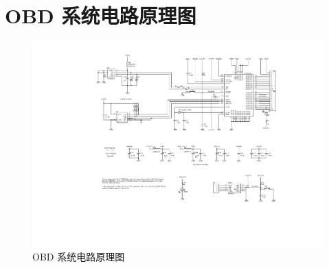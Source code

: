 

\chapter{OBD 系统电路原理图}

\begin{figure}[h]
	\centering
	\includegraphics[width=\textwidth]{figures/Sheet1.pdf}
	\caption{OBD 系统电路原理图}\label{fig:sheet}
\end{figure}
